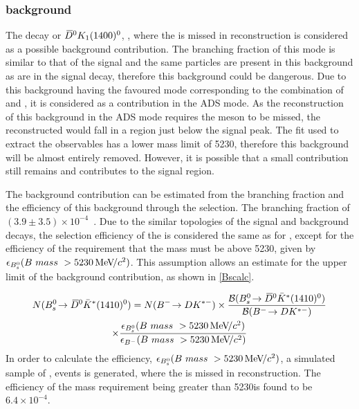 \subsubsection{\boldmath {} background}
\label{sec:backgrounds:bs}

The decay  or ${{\kern 0.2em\overline{\kern -0.2em D}{}}{}^0} K_1(1400)^0$, , where the \pip is missed in reconstruction is considered as a possible background contribution. The branching fraction of this mode is similar to that of the signal and the same particles are present in this background as are in the signal decay, therefore this background could be dangerous. Due to this background having the favoured mode corresponding to the combination of \Dzb and \Kstarm, it is considered as a contribution in the ADS mode. As the reconstruction of this background in the ADS mode requires the \pip meson to be missed, the reconstructed \Bm would fall in a region just below the signal peak. The fit used to extract the \CP observables has a lower mass limit of 5230\mevcc, therefore this background will be almost entirely removed. However, it is possible that a small contribution still remains and contributes to the signal region. 

The \Bs background contribution can be estimated from the branching fraction and the efficiency of this background through the \btodkst selection. The  branching fraction of $\left(3.9 \pm 3.5\right) \times 10^{-4}$~\cite{PDG2016}. Due to the similar topologies of the signal and background decays, the selection efficiency of the  is considered the same as for \btodkst, except for the efficiency of the requirement that the \Bm mass must be above 5230\mevcc, given by $\epsilon_{{{B}^0_{s}}}(B\ mass\ > 5230{\mathrm{\,Me\kern -0.1em V\!/}c^2})$. This assumption allows an estimate for the upper limit of the background contribution, as shown in \eqn\ref{Bscalc}. 

\begin{multline}
N(\decay{\Bs}{\Dzb\bar{K}^{*}(1410)^0}) = N(\btodkst) \times \frac{\BF(\decay{\Bs}{\Dzb\bar{K}^{*}(1410)^0})}{\BF(\btodkst)} \\ \times \frac{\epsilon_{\Bs}(B\ mass\ > 5230\mevcc)}{\epsilon_{\Bm}(B\ mass\ > 5230\mevcc)}
\label{Bscalc}
\end{multline}
In order to calculate the efficiency, $\epsilon_{{{B}^0_{s}}}(B\ mass\ > 5230{\mathrm{\,Me\kern -0.1em V\!/}c^2})$, a simulated sample of ,  events is generated, where the \pip is missed in reconstruction. The efficiency of the \Bm mass requirement being greater than 5230\mev is found to be $6.4 \times 10^{-4}$. 

